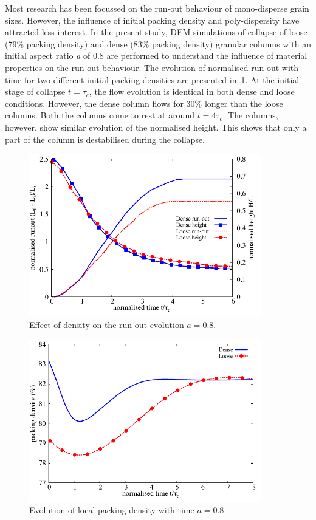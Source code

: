 Most research has been focussed on the run-out behaviour of mono-disperse 
grain sizes. However, the influence of initial packing density and 
poly-dispersity have attracted less interest. In the present study, DEM 
simulations of collapse of loose (79\% packing density) and dense (83\% 
packing density) granular columns with an initial aspect ratio \textit{a} of 
0.8 are performed to understand the influence of material properties on the 
run-out behaviour. The evolution of normalised run-out with time for two 
different initial packing densities are presented 
in~\cref{fig:runout_height_dense_r18}. At the initial 
stage of collapse $t=\tau_c$, the flow evolution is identical in both dense and 
loose conditions. However, the dense column flows for 30\% longer than the 
loose columns. Both the columns come to rest at around $t = 4\tau_c$. The 
columns, however, show similar evolution of the normalised height. This shows 
that only a part of the column is destabilised during the collapse.
\begin{figure}[h]
\centering
\includegraphics[width=0.9\textwidth]{runout_height_dense_r18}
\caption{Effect of density on the run-out evolution $a = 0.8$.}
\label{fig:runout_height_dense_r18}
\end{figure}

\begin{figure}[h]
\centering
\includegraphics[width=0.9\textwidth]{voro_r18}
\caption{Evolution of local packing density with time $a = 0.8$.}
\label{fig:voro_r18}
\end{figure}

